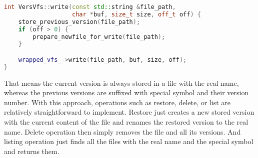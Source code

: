 \begin{lstlisting}[language=c++, basicstyle=\ttfamily\small]
int VersVfs::write(const std::string &file_path,
                   char *buf, size_t size, off_t off) {
    store_previous_version(file_path);
    if (off > 0) {
        prepare_newfile_for_write(file_path);
    }

    wrapped_vfs_->write(file_path, buf, size, off);
}
\end{lstlisting}

That means the current version is always stored in a file with the real name, whereas the previous versions are suffixed with special symbol and their version number.
With this approach, operations such as restore, delete, or list are relatively straightforward to implement.
Restore just creates a new stored version with the current content of the file and renames the restored version to the real name.
Delete operation then simply removes the file and all its versions.
And listing operation just finds all the files with the real name and the special symbol and returns them.